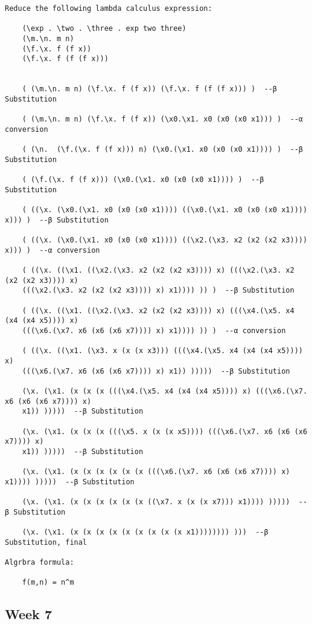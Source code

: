 \documentclass{article}
\theoremstyle{theorem}
\theoremstyle{definition}
\theoremstyle{remark}
\begin{document}
\begin{verbatim}
Reduce the following lambda calculus expression:

    (\exp . \two . \three . exp two three)
    (\m.\n. m n)
    (\f.\x. f (f x))
    (\f.\x. f (f (f x)))

 
    ( (\m.\n. m n) (\f.\x. f (f x)) (\f.\x. f (f (f x))) )  --β Substitution

    ( (\m.\n. m n) (\f.\x. f (f x)) (\x0.\x1. x0 (x0 (x0 x1))) )  --α conversion

    ( (\n.  (\f.(\x. f (f x))) n) (\x0.(\x1. x0 (x0 (x0 x1)))) )  --β Substitution

    ( (\f.(\x. f (f x))) (\x0.(\x1. x0 (x0 (x0 x1)))) )  --β Substitution

    ( ((\x. (\x0.(\x1. x0 (x0 (x0 x1)))) ((\x0.(\x1. x0 (x0 (x0 x1)))) x))) )  --β Substitution

    ( ((\x. (\x0.(\x1. x0 (x0 (x0 x1)))) ((\x2.(\x3. x2 (x2 (x2 x3)))) x))) )  --α conversion

    ( ((\x. ((\x1. ((\x2.(\x3. x2 (x2 (x2 x3)))) x) (((\x2.(\x3. x2 (x2 (x2 x3)))) x) 
    (((\x2.(\x3. x2 (x2 (x2 x3)))) x) x1)))) )) )  --β Substitution

    ( ((\x. ((\x1. ((\x2.(\x3. x2 (x2 (x2 x3)))) x) (((\x4.(\x5. x4 (x4 (x4 x5)))) x) 
    (((\x6.(\x7. x6 (x6 (x6 x7)))) x) x1)))) )) )  --α conversion

    ( ((\x. ((\x1. (\x3. x (x (x x3))) (((\x4.(\x5. x4 (x4 (x4 x5)))) x) 
    (((\x6.(\x7. x6 (x6 (x6 x7)))) x) x1)) )))))  --β Substitution

    (\x. (\x1. (x (x (x (((\x4.(\x5. x4 (x4 (x4 x5)))) x) (((\x6.(\x7. x6 (x6 (x6 x7)))) x) 
    x1)) )))))  --β Substitution

    (\x. (\x1. (x (x (x (((\x5. x (x (x x5)))) (((\x6.(\x7. x6 (x6 (x6 x7)))) x) 
    x1)) )))))  --β Substitution

    (\x. (\x1. (x (x (x (x (x (x (((\x6.(\x7. x6 (x6 (x6 x7)))) x) x1)))) )))))  --β Substitution

    (\x. (\x1. (x (x (x (x (x (x ((\x7. x (x (x x7))) x1)))) )))))  --β Substitution

    (\x. (\x1. (x (x (x (x (x (x (x (x (x x1)))))))) )))  --β Substitution, final

Algrbra formula:

    f(m,n) = n^m
\end{verbatim}

\subsection{Week 7}
\end{document}
